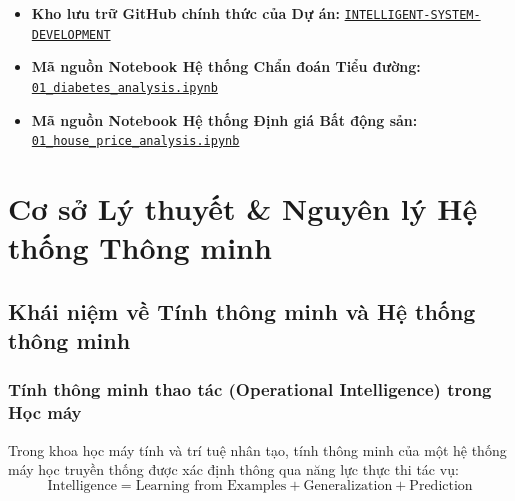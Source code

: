 \documentclass[12pt,a4paper]{report}
\begin{document}
\begin{tcolorbox}[colback=blue!3!white, colframe=blue!75!black, title=\textbf{Kho lưu trữ Mã nguồn \& Jupyter Notebook Thực nghiệm}]
\small
\begin{itemize}[leftmargin=1.5em, itemsep=3pt]
    \item \textbf{Kho lưu trữ GitHub chính thức của Dự án:} \href{https://github.com/phamtu2x5/INTELLIGENT-SYSTEM-DEVELOPMENT}{\texttt{INTELLIGENT-SYSTEM-DEVELOPMENT}}
    \item \textbf{Mã nguồn Notebook Hệ thống Chẩn đoán Tiểu đường:} \href{https://github.com/phamtu2x5/INTELLIGENT-SYSTEM-DEVELOPMENT/blob/main/src/Week%201/notebooks/01_diabetes_analysis.ipynb}{\texttt{01\_diabetes\_analysis.ipynb}}
    \item \textbf{Mã nguồn Notebook Hệ thống Định giá Bất động sản:} \href{https://github.com/phamtu2x5/INTELLIGENT-SYSTEM-DEVELOPMENT/blob/main/src/Week%202/house_price_prediction/notebooks/01_house_price_analysis.ipynb}{\texttt{01\_house\_price\_analysis.ipynb}}
\end{itemize}
\end{tcolorbox}

\newpage

\chapter{Cơ sở Lý thuyết \& Nguyên lý Hệ thống Thông minh}

\section{Khái niệm về Tính thông minh và Hệ thống thông minh}

\subsection{Tính thông minh thao tác (Operational Intelligence) trong Học máy}
Trong khoa học máy tính và trí tuệ nhân tạo, tính thông minh của một hệ thống máy học truyền thống được xác định thông qua năng lực thực thi tác vụ:
\begin{equation}
\text{Intelligence} = \text{Learning from Examples} + \text{Generalization} + \text{Prediction}
\end{equation}
\end{document}
